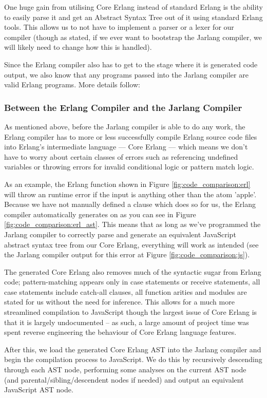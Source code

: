 \documentclass[twoside,12pt,titlepage,a4paper]{article}
\begin{document}
One huge gain from utilising Core Erlang instead of standard Erlang is the ability to easily parse it and get an Abstract Syntax Tree out of it using standard Erlang tools. This allows us to not have to implement a parser or a lexer for our compiler (though as stated, if we ever want to bootstrap the Jarlang compiler, we will likely need to change how this is handled).

Since the Erlang compiler also has to get to the stage where it is generated code output, we also know that any programs passed into the Jarlang compiler are valid Erlang programs. More details follow:

\subsubsection{Between the Erlang Compiler and the Jarlang Compiler}
As mentioned above, before the Jarlang compiler is able to do any work, the Erlang compiler has to more or less successfully compile Erlang source code files into Erlang's intermediate language --- Core Erlang --- which means we don't have to worry about certain classes of errors such as referencing undefined variables or throwing errors for invalid conditional logic or pattern match logic.

As an example, the Erlang function shown in Figure \ref{fig:code_comparison:erl} will throw an runtime error if the input is anything other than the atom 'apple'. Because we have not manually defined a clause which does so for us, the Erlang compiler automatically generates on as you can see in Figure \ref{fig:code_comparison:erl_ast}. This means that as long as we've programmed the Jarlang compiler to correctly parse and generate an equivalent JavaScript abstract syntax tree from our Core Erlang, everything will work as intended (see the Jarlang compiler output for this error at Figure \ref{fig:code_comparison:js}).

The generated Core Erlang also removes much of the syntactic sugar from Erlang code; pattern-matching appears only in case statements or receive statements, all case statements include catch-all clauses, all function arities and modules are stated for us without the need for inference. This allows for a much more streamlined compilation to JavaScript though the largest issue of Core Erlang is that it is largely undocumented -- as such, a large amount of project time was spent reverse engineering the behaviour of Core Erlang language features.

After this, we load the generated Core Erlang AST into the Jarlang compiler and begin the compilation process to JavaScript. We do this by recursively descending through each AST node, performing some analyses on the current AST node (and parental/sibling/descendent nodes if needed) and output an equivalent JavaScript AST node.
\end{document}
